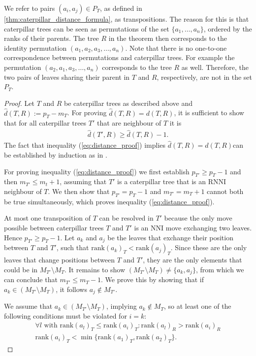 \documentclass[11pt]{amsart}
\newcommand{\rnni}{\mathrm{RNNI}}
\newcommand{\rank}{\mathrm{rank}}
\newcommand{\nni}{\mathrm{NNI}}
\begin{document}
We refer to pairs $(a_i,a_j) \in P_T$, as defined in \autoref{thm:caterpillar_distance_formula}, as transpositions.
The reason for this is that caterpillar trees can be seen as permutations of the set $\{a_1, \ldots, a_n\}$, ordered by the ranks of their parents.
The tree $R$ in the theorem then corresponds to the identity permutation $(a_1, a_2, a_3, \ldots, a_n)$.
Note that there is no one-to-one correspondence between permutations and caterpillar trees.
For example the permutation $(a_2, a_1, a_3, \ldots, a_n)$ corresponds to the tree $R$ as well.
Therefore, the two pairs of leaves sharing their parent in $T$ and $R$, respectively, are not in the set $P_T$.

\begin{proof}
	Let $T$ and $R$ be caterpillar trees as described above and $\hat d(T,R) := p_T - m_T$.
	For proving $\hat d(T,R) = d(T,R)$, it is sufficient to show that for all caterpillar trees $T'$ that are neighbour of $T$ it is
	\begin{align}
		\hat d(T',R) \geq \hat d(T,R) - 1.
		\label{eq:distance_proof}
	\end{align}
	The fact that inequality (\ref{eq:distance_proof}) implies $\hat d(T,R) = d(T,R)$can be established by induction as in \autocite[Theorem 1]{Collienne2020-iu}.

	For proving inequality (\ref{eq:distance_proof}) we first establish $p_{T'} \geq p_T - 1$ and then $m_{T'} \leq m_t + 1$, assuming that $T'$ is a caterpillar tree that is an $\rnni$ neighbour of $T$.
	We then show that $p_{T'} = p_T - 1$ and $m_{T'} = m_T + 1$ cannot both be true simultaneously, which proves inequality (\ref{eq:distance_proof}).

	At most one transposition of $T$ can be resolved in $T'$ because the only move possible between caterpillar trees $T$ and $T'$ is an $\nni$ move exchanging two leaves.
	Hence $p_{T'} \geq p_T - 1$.
	Let $a_k$ and $a_j$ be the leaves that exchange their position between $T$ and $T'$, such that $\rank(a_k)_T < \rank(a_j)_T$.
	Since these are the only leaves that change positions between $T$ and $T'$, they are the only elements that could be in $M_{T'} \setminus M_T$.
	It remains to show $(M_{T'} \setminus M_T) \neq \{a_k, a_j\}$, from which we can conclude that $m_{T'} \leq m_T - 1$.
	We prove this by showing that if $a_k \in (M_{T'} \setminus M_T)$, it follows $a_j \notin M_{T'}$.

	We assume that $a_k \in (M_{T'} \setminus M_T)$, implying $a_k \notin M_T$, so at least one of the following conditions must be violated for $i = k$:
	\setcounter{equation}{0} %
	\renewcommand{\theequation}{C\arabic{equation}}
	\begin{align}
		\forall l \text{ with } \rank(a_l)_T \leq \rank(a_i)_T: \rank(a_l)_R > \rank(a_i)_R \label{condition1}\\
		\rank(a_i)_T < \min\{\rank(a_1)_T, \rank(a_2)_T\}.
		\label{condition2}
	\end{align}
	\setcounter{equation}{1}
	\renewcommand{\theequation}{\arabic{equation}}


\end{proof}
\end{document}
